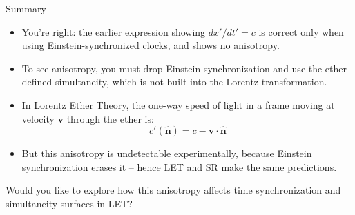 \documentclass[a4paper]{article}
\theoremstyle{plain}
\theoremstyle{definition}
\newcommand{\vect}[1]{\mathbf{#1}}
\newcommand{\hatvec}[1]{\hat{\mathbf{#1}}}
\begin{document}
Summary

\begin{itemize}

\item You're right: the earlier expression showing $dx'/dt' = c$ is
  correct only when using Einstein-synchronized clocks, and shows no
  anisotropy.

\item To see anisotropy, you must drop Einstein synchronization and
  use the ether-defined simultaneity, which is not built into the
  Lorentz transformation.

\item In Lorentz Ether Theory, the one-way speed of light in a frame
  moving at velocity $\vect{v}$ through the ether is:
\begin{equation}
c'(\hatvec{n}) = c - \vect{v} \cdot \hatvec{n}
\end{equation}

\item But this anisotropy is undetectable experimentally, because
  Einstein synchronization erases it -- hence LET and SR make the same
  predictions.
\end{itemize}

Would you like to explore how this anisotropy affects time
synchronization and simultaneity surfaces in LET?
\end{document}
